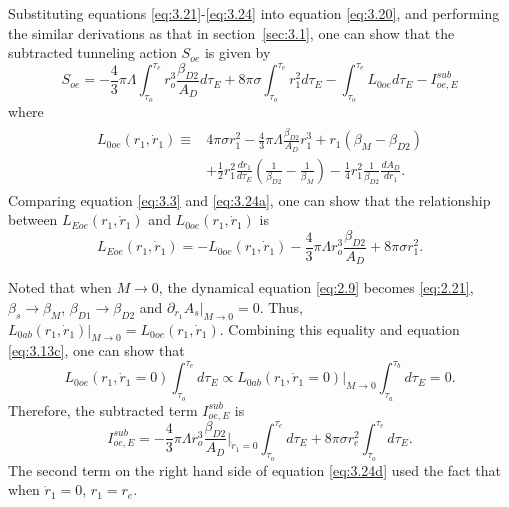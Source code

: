 \documentclass[12pt]{article}
\begin{document}
Substituting equations \eqref{eq:3.21}-\eqref{eq:3.24} into equation \eqref{eq:3.20}, and performing the similar derivations as that in section~\ref{sec:3.1}, one can show that the subtracted tunneling action $S_{oe}$ is given by
\begin{equation}
\label{eq:3.24a}%
S_{oe}=-\frac{4}{3}\pi\Lambda\int_{\tau_{o}}^{\tau_{e}}r_{o}^{3}\frac{\beta_{D2}}{A_{D}}d\tau_{E}+8\pi\sigma\int_{\tau_{o}}^{\tau_{e}}r_{1}^{2}d\tau_{E}-\int_{\tau_{o}}^{\tau_{e}}L_{0oe}d\tau_{E}-I^{sub}_{oe,E}
\end{equation}
where
\begin{eqnarray}\begin{split}
\label{eq:3.24b}%
L_{0oe}(r_{1}, \dot{r}_{1})\equiv & 4\pi\sigma r_{1}^{2}-\frac{4}{3}\pi\Lambda\frac{\beta_{D2}}{A_{D}}r_{1}^{3}
+r_{1}(\beta_{M}-\beta_{D2})\\&+\frac{1}{2}r_{1}^{2}\frac{d\dot{r}_{1}}{d\tau_{E}}(\frac{1}{\beta_{D2}}-\frac{1}{\beta_{M}})-
\frac{1}{4}r_{1}^{2}\frac{1}{\beta_{D2}}\frac{dA_{D}}{dr_{1}}.
\end{split}
\end{eqnarray}
Comparing equation \eqref{eq:3.3} and \eqref{eq:3.24a}, one can show that the relationship between $L_{Eoe}(r_{1}, \dot{r}_{1})$ and $L_{0oe}(r_{1}, \dot{r}_{1})$ is
\begin{equation}
\label{eq:3.24bb}%
L_{Eoe}(r_{1}, \dot{r}_{1})=-L_{0oe}(r_{1}, \dot{r}_{1})-\frac{4}{3}\pi\Lambda r_{o}^{3}\frac{\beta_{D2}}{A_{D}}+8\pi\sigma r_{1}^{2}.
\end{equation}

Noted that when $M\rightarrow 0$, the dynamical equation \eqref{eq:2.9} becomes \eqref{eq:2.21}, $\beta_{s}\rightarrow \beta_{M}$, $\beta_{D1}\rightarrow \beta_{D2}$ and $\partial_{r_{1}}A_{s}\Big|_{M\rightarrow0}=0$. Thus, $L_{0ab}(r_{1}, \dot{r}_{1})\Big|_{M\rightarrow 0}=L_{0oe}(r_{1}, \dot{r}_{1})$. Combining this equality and equation \eqref{eq:3.13c}, one can show that
\begin{equation}
\label{eq:3.24c}%
L_{0oe}(r_{1},\dot{r}_{1}=0)\int_{\tau_{o}}^{\tau_{e}}d\tau_{E}\propto L_{0ab}(r_{1},\dot{r}_{1}=0)\Big|_{M\rightarrow 0}\int_{\tau_{a}}^{\tau_{b}}d\tau_{E}=0.
\end{equation}
Therefore, the subtracted term $I^{sub}_{oe,E}$ is
\begin{equation}
\label{eq:3.24d}%
I^{sub}_{oe,E}=-\frac{4}{3}\pi\Lambda r_{o}^{3}\frac{\beta_{D2}}{A_{D}}\Big|_{\dot{r}_{1}=0}\int_{\tau_{o}}^{\tau_{e}}d\tau_{E}+8\pi\sigma r_{e}^{2}\int_{\tau_{o}}^{\tau_{e}}d\tau_{E}.
\end{equation}
The second term on the right hand side of equation \eqref{eq:3.24d} used the fact that when $\dot{r}_{1}=0$, $r_{1}=r_{e}$.
\end{document}
